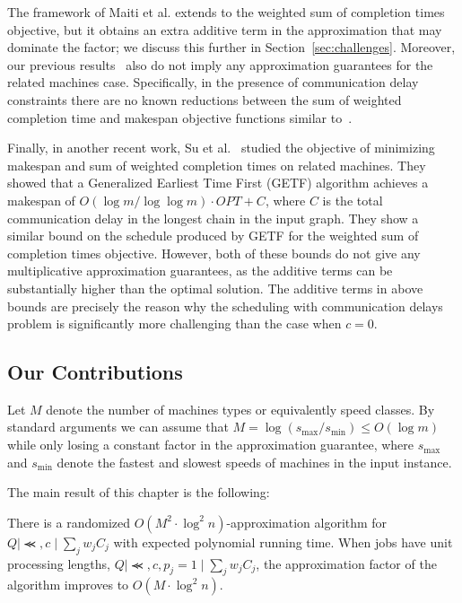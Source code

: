   The framework of Maiti {et al.} extends to the weighted sum of completion times objective, but it obtains 
  an extra additive term in the approximation that may dominate the factor; 
  we discuss this further in Section~\ref{sec:challenges}.
  Moreover, our previous results~\cite{DKRTZ20} also do not imply any approximation guarantees for the related machines case.
  Specifically, in the presence of communication delay constraints there are no known reductions
  between the sum of weighted completion time and makespan objective functions similar to~\cite{UniformlyRelatedMachinesWithPrecedences-ChudakShmoys-JALG99}.
  
  Finally, in another recent work, Su et al.~\cite{weirman} studied the objective of minimizing makespan and sum of weighted completion times on related machines. 
  They showed that a Generalized Earliest Time First (GETF) algorithm achieves a makespan of $O(\log m/\log \log m) \cdot OPT + C$, where $C$ is the total communication delay in the longest chain in the input graph.
  They show a similar bound on the schedule produced by GETF for the weighted sum of completion times objective.
  However, both of these bounds do not give any multiplicative approximation guarantees, as the additive terms can be substantially higher than the optimal solution.
  The additive terms in above bounds are precisely the reason why the scheduling with communication delays problem is significantly more challenging than the case when $c = 0$.
  
  
  
  
  \subsection{Our Contributions}
  
  Let $M$ denote the number of machines types or equivalently speed classes.
  By standard arguments we can assume that $M =\log(s_{\text{max}}/s_{\text{min}})\leq O(\log m)$ while only losing a constant factor in the approximation guarantee, where $s_{\text{max}}$ and $s_{\text{min}}$ denote the fastest and slowest speeds of machines in the input instance.
  
  The main result of this chapter is the following:
  
  \begin{theorem} \label{thm:main}
  There is a randomized $O(M^2 \cdot \log^2 n)$-approximation algorithm for $Q \mid \Prec, c \mid \sum_{j} w_j C_j$ with expected polynomial running time. When jobs have unit processing lengths, $Q \mid \Prec, c, p_j = 1 \mid \sum_{j} w_j C_j$, the approximation factor of the algorithm improves to  $O(M \cdot \log^2 n )$.
  \end{theorem}
  
